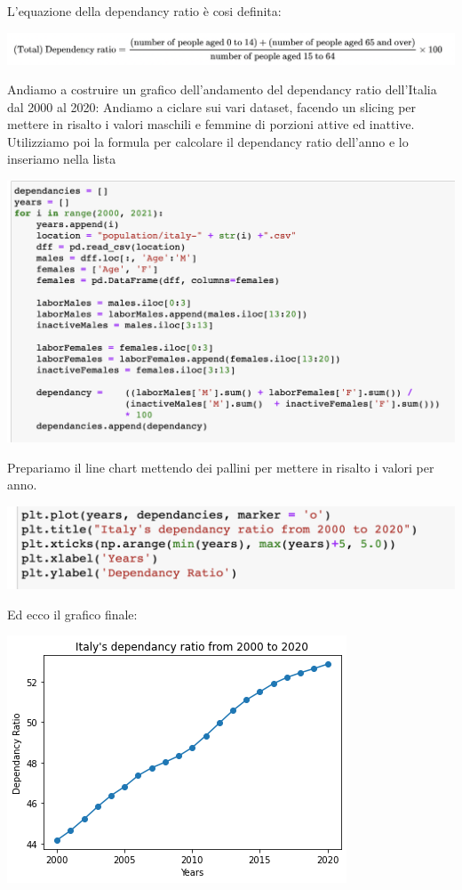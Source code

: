 \documentclass[11pt, oneside]{article}   	%
\begin{document}
L'equazione della dependancy ratio è cosi definita:
\begin{center}
\includegraphics[scale=0.5]{dependancy}
\end{center}
Andiamo a costruire un grafico dell'andamento del dependancy ratio dell'Italia dal 2000 al 2020:
Andiamo a ciclare sui vari dataset, facendo un slicing per mettere in risalto i valori maschili e femmine di porzioni attive ed inattive. Utilizziamo poi la formula per calcolare il dependancy ratio dell'anno e lo inseriamo nella lista
\begin{center}
\includegraphics[scale=0.5]{dep1}
\end{center}
Prepariamo il line chart mettendo dei pallini per mettere in risalto i valori per anno.
\begin{center}
\includegraphics[scale=0.5]{dep2}
\end{center}
Ed ecco il grafico finale:
\begin{center}
\includegraphics[scale=0.8]{dep3}
\end{center}
\end{document}
